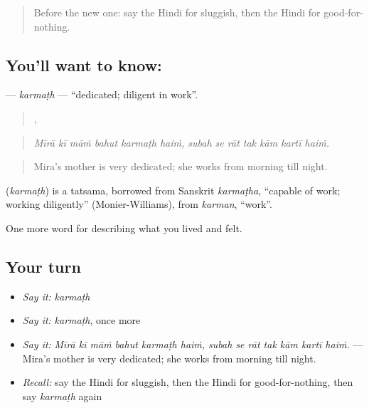 \label{lesson:HI-C472-karmath}



\begin{quote}
Before the new one: say the Hindi for sluggish, then the Hindi for good-for-nothing.
\end{quote}

\subsection*{You'll want to know: }
\textbf{} — \emph{karmaṭh} — \textquotedblleft{}dedicated; diligent in work\textquotedblright{}.

\begin{quote}
     ,       
\end{quote}

\begin{quote}
\emph{Mīrā kī māṁ bahut karmaṭh haiṁ, subah se rāt tak kām kartī haiṁ.}
\end{quote}

\begin{quote}
Mira's mother is very dedicated; she works from morning till night.
\end{quote}

\begin{cousinweb}
\textbf{} (\emph{karmaṭh}) is a tatsama, borrowed from Sanskrit \emph{karmaṭha}, \textquotedblleft{}capable of work; working diligently\textquotedblright{} (Monier-Williams), from \emph{karman}, \textquotedblleft{}work\textquotedblright{}.
\end{cousinweb}

\begin{grammarlens}[title={What you've built}]
One more word for describing what you lived and felt.
\end{grammarlens}

\subsection*{Your turn}
\begin{itemize}
\raggedright
  \item \emph{Say it:} \emph{karmaṭh}
  \item \emph{Say it:} \emph{karmaṭh}, once more
  \item \emph{Say it:} \emph{Mīrā kī māṁ bahut karmaṭh haiṁ, subah se rāt tak kām kartī haiṁ.} — Mira's mother is very dedicated; she works from morning till night.
  \item \emph{Recall:} say the Hindi for sluggish, then the Hindi for good-for-nothing, then say \emph{karmaṭh} again
\end{itemize}


